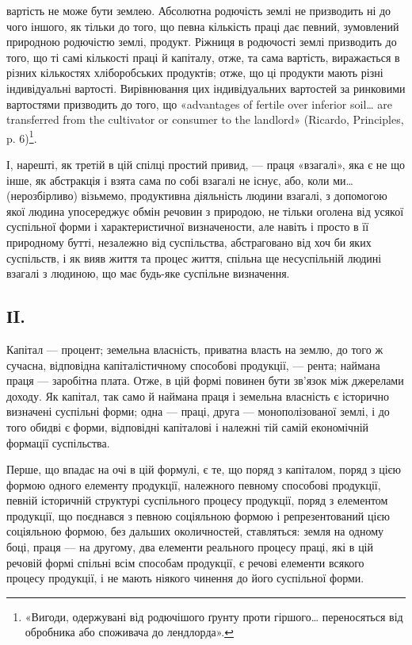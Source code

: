 \parcont{}  %
вартість не може бути землею. Абсолютна родючість землі не призводить ні до
чого іншого, як тільки до того, що певна кількість праці дає певний, зумовлений
природною родючістю землі, продукт. Ріжниця в родючості землі призводить
до того, що ті самі кількості праці й капіталу, отже, та сама вартість, виражається
в різних кількостях хліборобських продуктів; отже, що ці продукти
мають різні індивідуальні вартості. Вирівнювання цих індивідуальних вартостей
за ринковими вартостями призводить до того, що «advantages of fertile over inferior
soil\dots{} are transferred from the cultivator or consumer to the landlord» (Ricardo,
Principles, p. 6)\footnote*{
«Вигоди, одержувані від родючішого ґрунту проти гіршого\dots{} переносяться від обробника або
споживача до лендлорда».
}.
\enablefootnotebreak{}

І, нарешті, як третій в цій спілці простий привид, — праця «взагалі»,
яка є не що інше, як абстракція і взята сама по собі взагалі не існує, або,
коли ми\dots{} (нерозбірливо) візьмемо, продуктивна діяльність людини взагалі,
з допомогою якої людина упосереджує обмін речовин з природою, не тільки
оголена від усякої суспільної форми і характеристичної визначености, але навіть
і просто в її природному бутті, незалежно від суспільства, абстраговано від
хоч би яких суспільств, і як вияв життя та процес життя, спільна ще несуспільній
людині взагалі з людиною, що має будь-яке суспільне визначення.

\subsection*{ІI.}

Капітал — процент; земельна власність, приватна власть на землю, до того ж
сучасна, відповідна капіталістичному способові продукції, — рента; наймана праця
— заробітна плата. Отже, в цій формі повинен бути зв’язок між джерелами
доходу. Як капітал, так само й наймана праця і земельна власність є історично
визначені суспільні форми; одна — праці, друга — монополізованої землі, і до
того обидві є форми, відповідні капіталові і належні тій самій економічній
формації суспільства.

Перше, що впадає на очі в цій формулі, є те, що поряд з капіталом,
поряд з цією формою одного елементу продукції, належного певному способові
продукції, певній історичній структурі суспільного процесу продукції, поряд
з елементом продукції, що поєднався з певною соціяльною формою і репрезентований
цією соціяльною формою, без дальших околичностей, ставляться: земля
на одному боці, праця — на другому, два елементи реального процесу праці,
які в цій речовій формі спільні всім способам продукції, є речові елементи
всякого процесу продукції, і не мають ніякого чинення до його суспільної форми.


